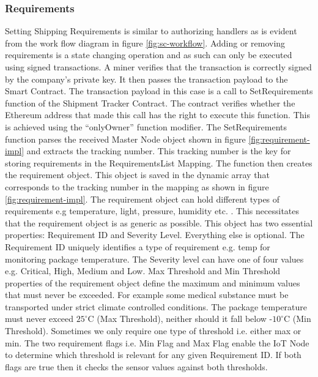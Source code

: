 \subsubsection{Requirements}
Setting Shipping Requirements is similar to authorizing handlers as is evident from the work flow diagram in figure \ref{fig:sc-workflow}. Adding or removing requirements is a state changing operation and as such can only be executed using signed transactions. A miner verifies that the transaction is correctly signed by the company’s private key. It then passes the transaction payload to the Smart Contract. The transaction payload in this case is a call to SetRequirements function of the Shipment Tracker Contract. The contract verifies whether the Ethereum address that made this call has the right to execute this function. This is achieved using the “onlyOwner” function modifier.  The SetRequirements function parses the received Master Node object shown in figure \ref{fig:requirement-impl} and extracts the tracking number. This tracking number is the key for storing requirements in the RequirementsList Mapping. The function then creates the requirement object. This object is saved in the dynamic array that corresponds to the tracking number in the mapping as shown in figure  \ref{fig:requirement-impl}. The requirement object can hold different types of requirements e.g temperature, light, pressure, humidity etc. . This necessitates that the requirement object is as generic as possible. This object has two essential properties: Requirement ID and Severity Level. Everything else is optional. The Requirement ID uniquely identifies a type of requirement e.g. temp for monitoring package temperature. The Severity level can have one of four values e.g. Critical, High, Medium and Low. Max Threshold and Min Threshold properties of the requirement object define the maximum and minimum values that must never be exceeded. For example some medical substance must be transported under strict climate controlled conditions. The package temperature must never exceed $25^\circ$C (Max Threshold), neither should it fall below -$10^\circ$C (Min Threshold). Sometimes we only require one type of threshold i.e. either max or min. The two requirement flags i.e. Min Flag and Max Flag enable the IoT Node to determine which threshold is relevant for any given Requirement ID. If both flags are true then it checks the sensor values against both thresholds.  
\vspace{1mm}
